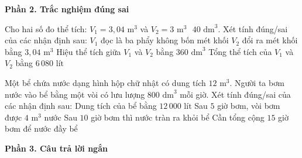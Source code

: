 \textbf{Phần 2. Trắc nghiệm đúng sai}

\begin{ex} %
Cho hai số đo thể tích: $V_1 = 3{,}04\text{ m}^3$ và $V_2 = 3\text{ m}^3\text{ }40\text{ dm}^3$. Xét tính đúng/sai của các nhận định sau:
\choiceTF
{\True $V_1$ đọc là ba phẩy không bốn mét khối}
{\True $V_2$ đổi ra mét khối bằng $3{,}04\text{ m}^3$}
{Hiệu thể tích giữa $V_1$ và $V_2$ bằng $360\text{ dm}^3$}
{\True Tổng thể tích của $V_1$ và $V_2$ bằng $6\,080\text{ lít}$}
\end{ex}

\begin{ex} %
Một bể chứa nước dạng hình hộp chữ nhật có dung tích $12\text{ m}^3$. Người ta bơm nước vào bể bằng một vòi có lưu lượng $800\text{ dm}^3$ mỗi giờ. Xét tính đúng/sai của các nhận định sau:
{\choiceTF
{\True Dung tích của bể bằng $12\,000\text{ lít}$}
{\True Sau $5$ giờ bơm, vòi bơm được $4\text{ m}^3$ nước}
{Sau $10$ giờ bơm thì nước tràn ra khỏi bể}
{\True Cần tổng cộng $15$ giờ bơm để nước đầy bể}
}
\end{ex}

\textbf{Phần 3. Câu trả lời ngắn}

